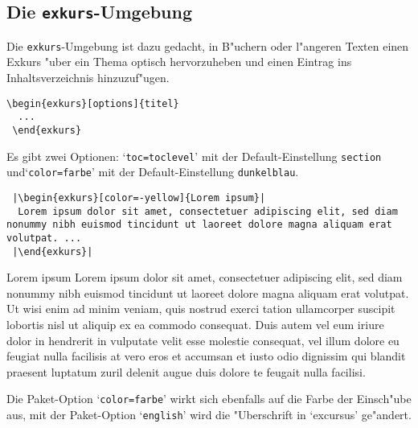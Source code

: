 \documentclass[a4paper,10pt,headsepline]{scrartcl}
\newcommand{\option}[1]{`\texttt{#1}'\xspace}
\begin{document}
\subsection{Die \texttt{exkurs}-Umgebung}
Die \texttt{exkurs}-Umgebung ist dazu gedacht, in B"uchern oder l"angeren Texten einen Exkurs "uber ein Thema optisch hervorzuheben und einen Eintrag ins Inhaltsverzeichnis hinzuzuf"ugen.
\begin{lstlisting}[numbers=none,basicstyle=\normalsize\ttfamily]
 \begin{exkurs}[options]{titel}
  ...
 \end{exkurs}
\end{lstlisting}
Es gibt zwei Optionen: \option{toc=toclevel} mit der Default-Einstellung \verb=section= und\linebreak\option{color=farbe} mit der Default-Einstellung \verb=dunkelblau=.
\begin{lstlisting}
 |\begin{exkurs}[color=-yellow]{Lorem ipsum}|
  Lorem ipsum dolor sit amet, consectetuer adipiscing elit, sed diam nonummy nibh euismod tincidunt ut laoreet dolore magna aliquam erat volutpat. ...
 |\end{exkurs}|
\end{lstlisting}
\begin{exkurs}[color=-yellow,toc=paragraph]{Lorem ipsum}
 Lorem ipsum dolor sit amet, consectetuer adipiscing elit, sed diam nonummy nibh euismod tincidunt ut laoreet dolore magna aliquam erat volutpat. Ut wisi enim ad minim veniam, quis nostrud exerci tation ullamcorper suscipit lobortis nisl ut aliquip ex ea commodo consequat. Duis autem vel eum iriure dolor in hendrerit in vulputate velit esse molestie consequat, vel illum dolore eu feugiat nulla facilisis at vero eros et accumsan et iusto odio dignissim qui blandit praesent luptatum zuril delenit augue duis dolore te feugait nulla facilisi.
\end{exkurs}
Die Paket-Option \option{color=farbe} wirkt sich ebenfalls auf die Farbe der Einsch"ube aus, mit der Paket-Option \option{english} wird die "Uberschrift in `excursus' ge"andert.
\end{document}
